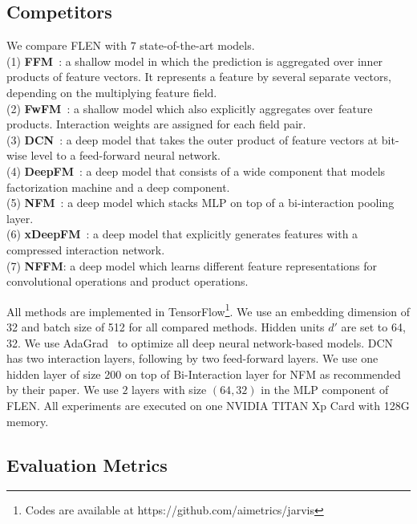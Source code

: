 \documentclass[sigconf]{acmart}
\begin{document}
\subsection{Competitors}

We compare FLEN with $7$ state-of-the-art models. \\
(1) \textbf{FFM}~\citep{juan2017field}: a shallow model in which the prediction is aggregated over inner products of feature vectors. It represents a feature by several separate vectors, depending on the multiplying feature field. \\
(2) \textbf{FwFM}~\citep{pan2018field}: a shallow model which also explicitly aggregates over feature products. Interaction weights are assigned for each field pair. \\
(3) \textbf{DCN}~\citep{wang2017deep}: a deep model that takes the outer product of feature vectors at bit-wise level to a feed-forward neural network. \\
(4) \textbf{DeepFM}~\citep{guo2017deepfm}: a deep model that consists of a wide component that models factorization machine and a deep component. \\
(5) \textbf{NFM}~\citep{he2017neural}: a deep model which stacks MLP on top of a bi-interaction pooling layer. \\
(6) \textbf{xDeepFM}~\citep{lian2018xdeepfm}: a deep model that explicitly generates features with a compressed interaction network. \\
(7) \textbf{NFFM}\citep{Yang2019Operation}: a deep model which learns different feature representations for convolutional operations and product operations.

All methods are implemented in TensorFlow\footnote{Codes are available at https://github.com/aimetrics/jarvis}.
We use an embedding dimension of 32 and batch size of 512 for all compared methods. Hidden units $d'$ are set to 64, 32. We use AdaGrad~\citep{duchi2011adaptive} to optimize all deep neural network-based models. DCN has two interaction layers, following by two feed-forward layers. We use one hidden layer of size 200 on top of Bi-Interaction layer for NFM as recommended by their paper. 
We use $2$ layers with size $(64,32)$ in the MLP component of FLEN. 
All experiments are executed on one NVIDIA TITAN Xp Card with 128G memory.

\subsection{Evaluation Metrics}
\end{document}
